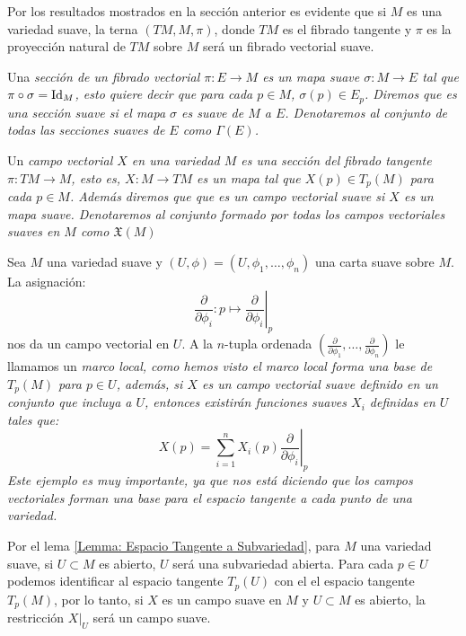 Por los resultados mostrados en la sección anterior es evidente que si $M$ es una variedad suave, la terna $(TM, M, \pi)$, donde $TM$ es el fibrado tangente y $\pi$ es la proyección natural de $TM$ sobre $M$ será un fibrado vectorial suave.

\begin{definition}
  Una \it{sección} de un fibrado vectorial $\pi: E \to M$ es un mapa suave $\sigma: M \to E$ tal que $\pi \circ \sigma = \mathrm{Id}_{M}$, esto quiere decir que para cada $p \in M$, $\sigma(p) \in E_p$. Diremos que es una \it{sección suave} si el mapa $\sigma$ es suave de $M$ a $E$. Denotaremos al conjunto de todas las secciones suaves de $E$ como $\Gamma(E)$.
\end{definition}

\begin{definition}
  Un \it{campo vectorial} $X$ en una variedad $M$ es una sección del fibrado tangente $\pi: TM \to M$, esto es, $X: M \to TM$ es un mapa tal que $X(p) \in T_{p}(M)$ para cada $p \in M$. Además diremos que que es un \it{campo vectorial suave} si $X$ es un mapa suave. Denotaremos al conjunto formado por todas los campos vectoriales suaves en $M$ como $\mathfrak{X}(M)$
\end{definition}

\begin{example}
  Sea $M$ una variedad suave y $(U,\phi)=(U,\phi_1, \dots,\phi_n)$ una carta suave sobre $M$. La asignación:
  \[
    \frac{\partial}{\partial \phi_i}: p \mapsto \left. \frac{\partial}{\partial \phi_i}\right|_{p}
  \]
  nos da un campo vectorial en $U$. A la $n$-tupla ordenada $(\frac{\partial}{\partial \phi_1}, \dots, \frac{\partial}{\partial \phi_n})$ le llamamos un \it{marco local}, como hemos visto el marco local forma una base de $T_p(M)$ para $p \in U$, además, si $X$ es un campo vectorial suave definido en un conjunto que incluya a $U$, entonces existirán funciones suaves $X_i$ definidas en $U$ tales que:
\[
  X(p) = \sum_{i=1}^{n}X_i(p)\left.\frac{\partial}{\partial\phi_i} \right|_{p}
\]
Este ejemplo es muy importante, ya que nos está diciendo que los campos vectoriales forman una base para el espacio tangente a cada punto de una variedad.
\end{example}

Por el lema \ref{Lemma: Espacio Tangente a Subvariedad}, para $M$ una variedad suave, si $U \subset M$ es abierto, $U$ será una subvariedad abierta. Para cada $p \in U$ podemos identificar al espacio tangente $T_p(U)$ con el el espacio tangente $T_p(M)$, por lo tanto, si $X$ es un campo suave en $M$ y $U \subset M$ es abierto, la restricción $X|_{U}$ será un campo suave.


